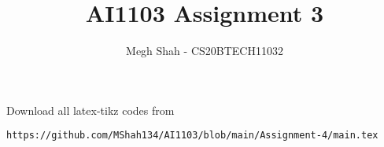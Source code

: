 \documentclass[journal,12pt,twocolumn]{IEEEtran}
\DeclareMathOperator*{\Res}{Res}
\begin{document}
\newcommand{\BEQA}{\begin{eqnarray}}
\newcommand{\EEQA}{\end{eqnarray}}
\newcommand{\define}{\stackrel{\triangle}{=}}

\raggedbottom
\setlength{\parindent}{0pt}
\providecommand{\mbf}{\mathbf}
\providecommand{\pr}[1]{\ensuremath{\Pr\left(#1\right)}}
\providecommand{\qfunc}[1]{\ensuremath{Q\left(#1\right)}}
\providecommand{\sbrak}[1]{\ensuremath{{}\left[#1\right]}}
\providecommand{\lsbrak}[1]{\ensuremath{{}\left[#1\right.}}
\providecommand{\rsbrak}[1]{\ensuremath{{}\left.#1\right]}}
\providecommand{\brak}[1]{\ensuremath{\left(#1\right)}}
\providecommand{\lbrak}[1]{\ensuremath{\left(#1\right.}}
\providecommand{\rbrak}[1]{\ensuremath{\left.#1\right)}}
\providecommand{\cbrak}[1]{\ensuremath{\left\{#1\right\}}}
\providecommand{\lcbrak}[1]{\ensuremath{\left\{#1\right.}}
\providecommand{\rcbrak}[1]{\ensuremath{\left.#1\right\}}}
\theoremstyle{remark}
\newtheorem{rem}{Remark}
\newcommand{\sgn}{\mathop{\mathrm{sgn}}}
\providecommand{\abs}[1]{\vert#1\vert}
\providecommand{\res}[1]{\Res\displaylimits_{#1}} 
\providecommand{\norm}[1]{\lVert#1\rVert}
\providecommand{\mtx}[1]{\mathbf{#1}}
\providecommand{\mean}[1]{E[ #1 ]}
\providecommand{\fourier}{\overset{\mathcal{F}}{ \rightleftharpoons}}
\providecommand{\system}{\overset{\mathcal{H}}{ \longleftrightarrow}}
\newcommand{\solution}{\noindent \textbf{Solution: }}
\newcommand{\cosec}{\,\text{cosec}\,}
\providecommand{\dec}[2]{\ensuremath{\overset{#1}{\underset{#2}{\gtrless}}}}
\newcommand{\myvec}[1]{\ensuremath{\begin{pmatrix}#1\end{pmatrix}}}
\newcommand{\mydet}[1]{\ensuremath{\begin{vmatrix}#1\end{vmatrix}}}
\makeatletter
{}
\makeatother
\let\StandardTheFigure\thefigure
\let\vec\mathbf
\renewcommand{\thefigure}{\theproblem}
\def\putbox#1#2#3{\makebox[0in][l]{\makebox[#1][l]{}\raisebox{\baselineskip}[0in][0in]{\raisebox{#2}[0in][0in]{#3}}}}
     \def\rightbox#1{\makebox[0in][r]{#1}}
     \def\centbox#1{\makebox[0in]{#1}}
     \def\topbox#1{\raisebox{-\baselineskip}[0in][0in]{#1}}
     \def\midbox#1{\raisebox{-0.5\baselineskip}[0in][0in]{#1}}
\vspace{3cm}
\title{AI1103 Assignment 3}
\author{Megh Shah - CS20BTECH11032}
\maketitle
\newpage
\bigskip
\renewcommand{\thefigure}{\theenumi}
\renewcommand{\thetable}{\theenumi}
Download all latex-tikz codes from 
%
\begin{lstlisting}
https://github.com/MShah134/AI1103/blob/main/Assignment-4/main.tex
\end{lstlisting}
\end{document}
